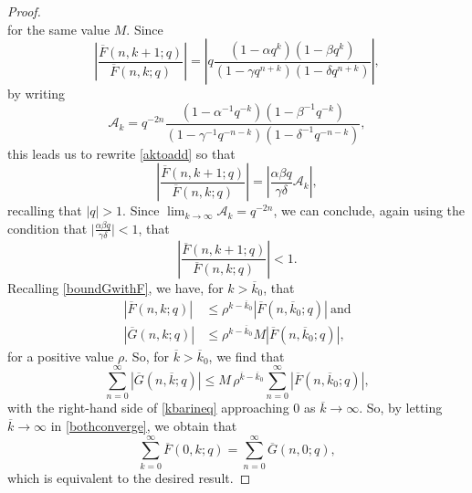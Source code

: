 \documentclass[12pt]{article}
\begin{document}
\begin{proof}
\begin{equation}
\end{equation}
 for the same value $M$. Since 
\begin{equation}\label{aktoadd}
 \left| \frac{\overline{F}(n, k+1;q)}{\overline{F}(n,k;q)} \right|    = \left| q \frac{ \left( 1 - \alpha q^{k} \right) \left( 1 - \beta q^{k} 
 \right) }{ \left( 1 - \gamma q^{n+k} \right) \left( 1 - \delta q^{n+k} \right) } \right|, 
\end{equation}
 by writing   $$ \mathcal{A}_{k} = q^{-2n} \frac{\left( 1 - \alpha^{-1} q^{-k} \right) 
 \left( 1 - \beta^{-1} q^{-k} \right) }{ \left( 1 - \gamma^{-1} q^{-n-k} \right) \left( 1 - 
 \delta^{-1} q^{-n-k} \right) }, $$
 this leads us to rewrite \eqref{aktoadd} so that 
\begin{equation*}
 \left| \frac{\overline{F}(n, k+1;q)}{\overline{F}(n,k;q)} \right| 
 = \left| \frac{\alpha \beta q}{\gamma \delta} \mathcal{A}_{k} \right|, 
\end{equation*}
 recalling that $|q| > 1$.  Since $\lim_{k \to \infty} \mathcal{A}_{k} = q^{-2n}$,   we can conclude, again using the condition that $\big|  
 \frac{\alpha \beta q}{\gamma \delta} \big| < 1$,  that 
\begin{equation*}
 \left| \frac{\overline{F}(n, k+1;q)}{\overline{F}(n,k;q)} \right|  < 1. 
\end{equation*}
 Recalling \eqref{boundGwithF}, we have, for $k > \overline{k}_{0}$, that 
\begin{align*}
 \left| \overline{F}(n, k; q) \right| & \leq \rho^{k - \overline{k}_{0}} \left| \overline{F}(n, \overline{k}_{0}; q) \right| \ \text{and} \\ 
 \left| \overline{G}(n, k;q) \right| & \leq \rho^{k - \overline{k}_{0}} M \left| \overline{F}(n, \overline{k}_{0}; q) \right|, 
\end{align*}
 for a positive value $\rho$. 
 So, for $\overline{k} > \overline{k}_{0}$, we find that
\begin{equation}\label{kbarineq}
 \sum_{n=0}^{\infty} \left| \overline{G}(n, \overline{k};q) \right| 
 \leq M \, \rho^{\overline{k} - \overline{k}_{0}} \sum_{n=0}^{\infty} \left| \overline{F}(n, \overline{k}_{0}; q) \right|, 
\end{equation} 
 with the right-hand side of \eqref{kbarineq} approaching $0$
 as $\overline{k} \to \infty$. 
 So, by letting $\overline{k} \to \infty$ in \eqref{bothconverge}, 
 we obtain that 
 $$ \sum_{k=0}^{\infty} \overline{F}(0, k;q) = \sum_{n=0}^{\infty} \overline{G}(n,0;q), $$
 which is equivalent to the desired result. 
\end{proof}
\end{document}
